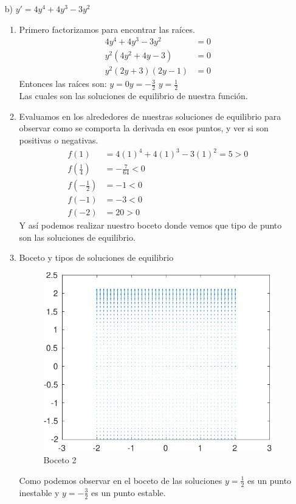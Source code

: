 \begin{itemize}
\item[b)] $y'=4y^4+4y^3-3y^2$
\begin{enumerate}
    \item Primero factorizamos para encontrar las raíces.
    \begin{align*}
        4y^4+4y^3-3y^2 &= 0 \\
        y^2(4y^2+4y-3) &= 0 \\
        y^2(2y+3)(2y-1) &= 0
    \end{align*}
    Entonces las raíces son:\hspace{.5cm} $y=0$\hspace{.5cm}$y=-\frac{3}{2}$\hspace{.5cm} $y=\frac{1}{2}$\\
        Las cuales son las soluciones de equilibrio de nuestra función.
    \item  Evaluamos en los alrededores de nuestras soluciones de equilibrio para observar como se comporta la derivada en esos puntos, y ver si son positivas o negativas.
    \begin{align*}
        f(1) &= 4(1)^4+4(1)^3-3(1)^2  = 5 > 0\\
        f(\frac{1}{4}) &= -\frac{7}{64} < 0\\
        f(-\frac{1}{2}) &= -1 < 0 \\
        f(-1) &= -3 < 0\\
        f(-2) &= 20 > 0
    \end{align*}
        Y así podemos realizar nuestro boceto donde vemos que tipo de punto son las soluciones de equilibrio.
        \item Boceto y tipos de soluciones de equilibrio
\begin{figure}[H]
    \centering
    \includegraphics[scale=1.2]{IM/b1.pdf}
    \caption{Boceto 2}
    \label{fig=int1}
\end{figure}
        Como podemos observar en el boceto de las soluciones $y=\frac{1}{2}$ es un punto inestable y $y=-\frac{3}{2}$ es un punto estable.
    
\end{enumerate}

\end{itemize}
